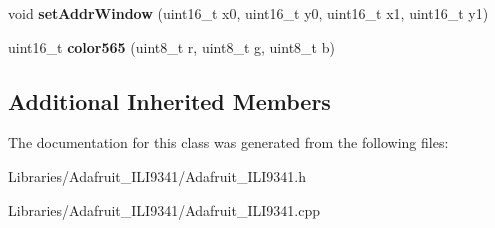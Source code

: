 \begin{DoxyCompactItemize}
\item 
\hypertarget{class_adafruit___i_l_i9341_a5f8856f69cf45a14b4500e58a3322470}{}void {\bfseries set\+Addr\+Window} (uint16\+\_\+t x0, uint16\+\_\+t y0, uint16\+\_\+t x1, uint16\+\_\+t y1)\label{class_adafruit___i_l_i9341_a5f8856f69cf45a14b4500e58a3322470}

\item 
\hypertarget{class_adafruit___i_l_i9341_a3ae835b461eedc7cfd687110ff5cb447}{}uint16\+\_\+t {\bfseries color565} (uint8\+\_\+t r, uint8\+\_\+t g, uint8\+\_\+t b)\label{class_adafruit___i_l_i9341_a3ae835b461eedc7cfd687110ff5cb447}

\end{DoxyCompactItemize}
\subsection*{Additional Inherited Members}


The documentation for this class was generated from the following files\+:\begin{DoxyCompactItemize}
\item 
Libraries/\+Adafruit\+\_\+\+I\+L\+I9341/Adafruit\+\_\+\+I\+L\+I9341.\+h\item 
Libraries/\+Adafruit\+\_\+\+I\+L\+I9341/Adafruit\+\_\+\+I\+L\+I9341.\+cpp\end{DoxyCompactItemize}
